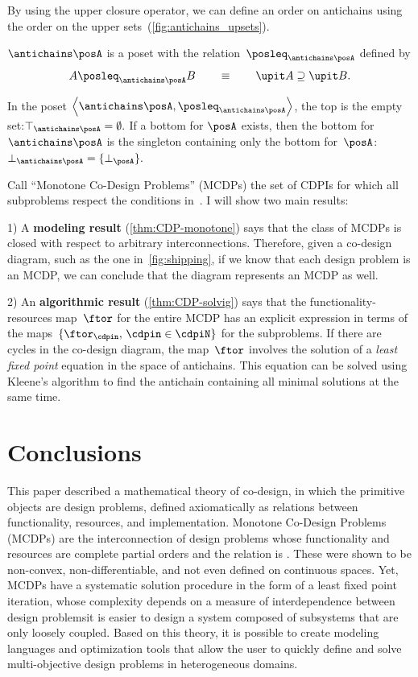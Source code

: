 By using the upper closure operator, we can define an order on antichains
using the order on the upper sets~(\cref{fig:antichains_upsets}).
\begin{lemma}
  \label{lem:antichains-are-poset}$\antichains\posA$ is a poset with
  the relation~$\posleq_{\antichains\posA}$ defined by
  \[
    A\posleq_{\antichains\posA}B\qquad\equiv\qquad\upit A\supseteq\upit B.
  \]
\end{lemma}
In the poset $\left\langle \antichains\posA,\posleq_{\antichains\posA}\right\rangle $,
the top is the empty set:$\top_{\antichains\posA}=\emptyset.$ If
a bottom for $\posA$ exists, then the bottom for~$\antichains\posA$
is the singleton containing only the bottom for~$\posA$: $\bot_{\antichains\posA}=\{\bot_{\posA}\}.$






Call ``Monotone Co-Design Problems'' (MCDPs) the set of CDPIs for
which all subproblems respect the conditions in~.
I will show two main results:

1) A \textbf{modeling result} (\cref{thm:CDP-monotone})
says that the class of MCDPs is closed with respect to arbitrary interconnections.
Therefore, given a co-design diagram, such as the one in~\cref{fig:shipping},
if we know that each design problem is an MCDP, we can conclude that
the diagram represents an MCDP as well.

2) An \textbf{algorithmic result }(\cref{thm:CDP-solvig})
says that the functionality-resources map~$\ftor$ for the entire
MCDP has an explicit expression in terms of the maps~$\{\ftor_{\cdpin},\,\cdpin\in\cdpiN\}$
for the subproblems. If there are cycles in the co-design diagram,
the map~$\ftor$ involves the solution of a\emph{ least fixed point}
equation in the space of antichains. This equation can be solved using
Kleene's algorithm to find the antichain containing all minimal solutions
at the same time.


\section{Conclusions}

This paper described a mathematical theory of co-design, in which
the primitive objects are design problems, defined axiomatically as
relations between functionality, resources, and implementation. Monotone
Co-Design Problems (MCDPs) are the interconnection of design problems
whose functionality and resources are complete partial orders and
the relation is \scottcontinuous. These were shown to be non-convex,
non-differentiable, and not even defined on continuous spaces. Yet,
MCDPs have a systematic solution procedure in the form of a least
fixed point iteration, whose complexity depends on a measure of interdependence
between design problems\textemdash it is easier to design a system
composed of subsystems that are only loosely coupled. Based on this
theory, it is possible to create modeling languages and optimization
tools that allow the user to quickly define and solve multi-objective
design problems in heterogeneous domains.






